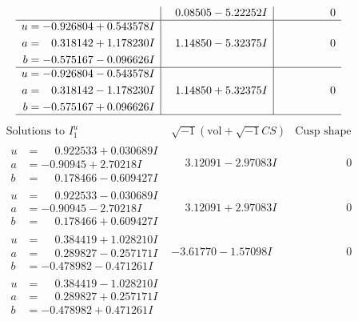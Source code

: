 \documentclass[1p]{elsarticle_modified}
\theoremstyle{definition}
\newcommand{\I}{\sqrt{-1}}
\begin{document}
$$\begin{array}{c|c|c}
 & \phantom{-}0.08505 - 5.22252 I & \phantom{-0.000000 } 0 \\ \hline\begin{aligned}
u &= -0.926804 + 0.543578 I \\
a &= \phantom{-}0.318142 + 1.178230 I \\
b &= -0.575167 - 0.096626 I\end{aligned}
 & \phantom{-}1.14850 - 5.32375 I & \phantom{-0.000000 } 0 \\ \hline\begin{aligned}
u &= -0.926804 - 0.543578 I \\
a &= \phantom{-}0.318142 - 1.178230 I \\
b &= -0.575167 + 0.096626 I\end{aligned}
 & \phantom{-}1.14850 + 5.32375 I & \phantom{-0.000000 } 0\\
 \hline 
 \end{array}$$\newpage$$\begin{array}{c|c|c}  
\text{Solutions to }I^u_{1}& \I (\text{vol} + \sqrt{-1}CS) & \text{Cusp shape}\\
 \hline 
\begin{aligned}
u &= \phantom{-}0.922533 + 0.030689 I \\
a &= -0.90945 + 2.70218 I \\
b &= \phantom{-}0.178466 - 0.609427 I\end{aligned}
 & \phantom{-}3.12091 - 2.97083 I & \phantom{-0.000000 } 0 \\ \hline\begin{aligned}
u &= \phantom{-}0.922533 - 0.030689 I \\
a &= -0.90945 - 2.70218 I \\
b &= \phantom{-}0.178466 + 0.609427 I\end{aligned}
 & \phantom{-}3.12091 + 2.97083 I & \phantom{-0.000000 } 0 \\ \hline\begin{aligned}
u &= \phantom{-}0.384419 + 1.028210 I \\
a &= \phantom{-}0.289827 - 0.257171 I \\
b &= -0.478982 - 0.471261 I\end{aligned}
 & -3.61770 - 1.57098 I & \phantom{-0.000000 } 0 \\ \hline\begin{aligned}
u &= \phantom{-}0.384419 - 1.028210 I \\
a &= \phantom{-}0.289827 + 0.257171 I \\
b &= -0.478982 + 0.471261 I\end{aligned}

\end{array}$$
\end{document}
